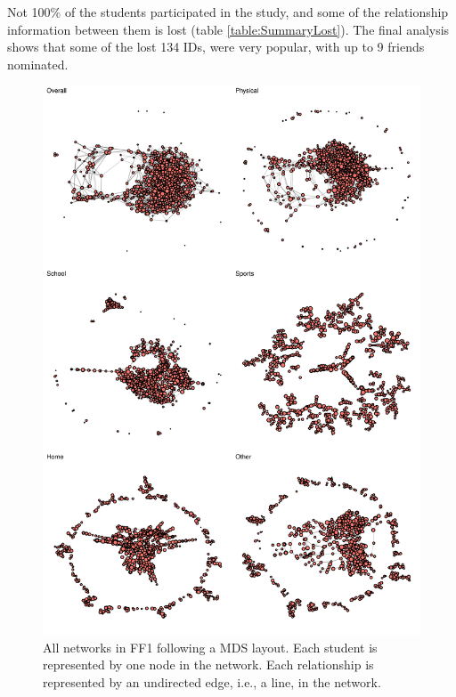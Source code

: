 Not 100\% of the students participated in the study, and some of the relationship information between them is lost (table \ref{table:SummaryLost}). The final analysis shows that some of the lost 134 IDs, were very popular, with up to 9 friends nominated.

    \begin{figure}[ht!]
        \centering
            \includegraphics[width=0.8\linewidth]{figures/Methodology/allGraphs.png } 
        \caption{All networks in FF1 following a MDS layout. Each student is represented by one node in the network. Each relationship is represented by an undirected edge, i.e., a line, in the network.}
        \label{figure:allNetwork}
    \end{figure}

